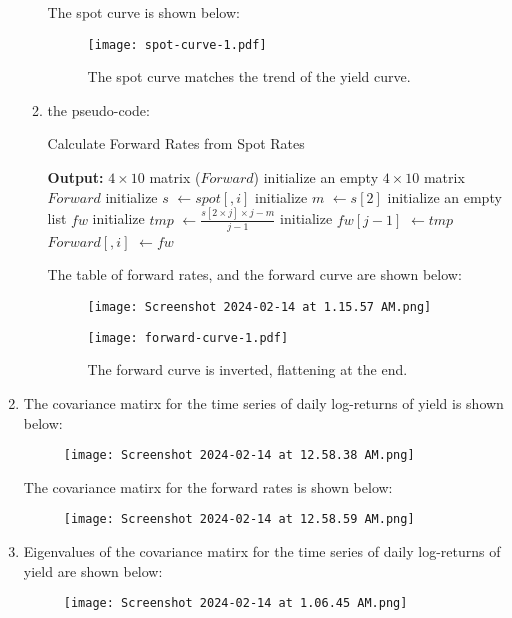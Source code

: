 \documentclass{article}
\begin{document}
\begin{enumerate}
\begin{enumerate}
        The spot curve is shown below:
        
        \begin{figure}[h]
            \centering
            \texttt{[image: spot-curve-1.pdf]}
            \caption{The spot curve matches the trend of the yield curve.}
        \end{figure}
        \item the pseudo-code:
        \begin{algorithm}[H]
        \caption{Calculate Forward Rates from Spot Rates }
            \begin{algorithmic}[1]
                \State \textbf{Output:} $4 \times 10$ matrix ($Forward$)
                \State initialize an empty $4 \times 10$ matrix $Forward$
                \State initialize $s$ $\gets spot[,i]$
                \State initialize $m$ $\gets s[2]$
                \State initialize an empty list $fw$
                \State initialize $tmp$ $\gets \frac{s[2\times j]\times j - m}{j-1}$
                \State initialize $fw[j-1]$ $\gets tmp$
                \EndFor
                \State $Forward[,i]$ $\gets fw$
                \EndFor      
            \end{algorithmic}
       \end{algorithm}
        
        The table of forward rates, and the forward curve are shown below:
        \begin{figure}[H]
            \centering
            \texttt{[image: Screenshot 2024-02-14 at 1.15.57 AM.png]} 
        \end{figure}
        \begin{figure}[h]
            \centering
            \texttt{[image: forward-curve-1.pdf]}
            \caption{The forward curve is inverted, flattening at the end.}
        \end{figure}  
    \end{enumerate}
        \item 
        The covariance matirx for the time series of daily log-returns of yield is shown below:
        \begin{figure}[H]
            \centering
            \texttt{[image: Screenshot 2024-02-14 at 12.58.38 AM.png]}    
        \end{figure}
        The covariance matirx for the forward rates is shown below:
        \begin{figure}[H]
            \centering
            \texttt{[image: Screenshot 2024-02-14 at 12.58.59 AM.png]}
        \end{figure}
        \item 
        Eigenvalues of the covariance matirx for the time series of daily log-returns of yield are shown below:
        \begin{figure}[H]
            \centering
            \texttt{[image: Screenshot 2024-02-14 at 1.06.45 AM.png]}
        \end{figure}
        

\end{enumerate}
\end{document}
